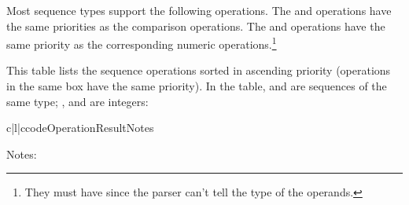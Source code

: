 Most sequence types support the following operations.  The  and
 operations have the same priorities as the comparison
operations.  The \samp{+} and \samp{*} operations have the same
priority as the corresponding numeric operations.\footnote{They must
have since the parser can't tell the type of the operands.}

This table lists the sequence operations sorted in ascending priority
(operations in the same box have the same priority).  In the table,
 and  are sequences of the same type; , 
and  are integers:

\begin{tableiii}{c|l|c}{code}{Operation}{Result}{Notes}
  \hline
  \hline
  \hline
\end{tableiii}

\noindent
Notes:


